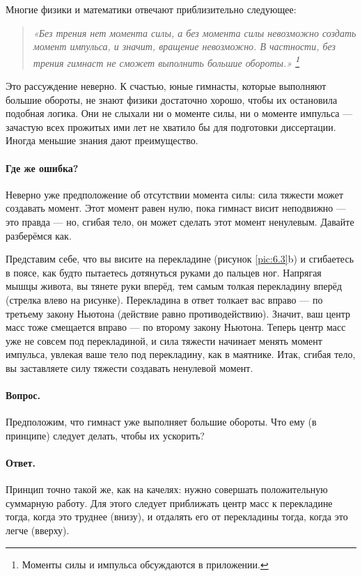 Многие физики и математики отвечают приблизительно следующее:
\begin{quote}
\emph{«Без трения нет момента силы, а без момента силы невозможно создать момент импульса,
и значит, вращение невозможно.
В частности, без трения гимнаст не сможет выполнить большие обороты.»
\footnote{Моменты силы и импульса обсуждаются в приложении.}}
\end{quote}

Это рассуждение неверно.
К счастью, юные гимнасты, которые выполняют большие обороты, не знают физики достаточно хорошо, чтобы их остановила подобная логика.
Они не слыхали ни о моменте силы, ни о моменте импульса ---
зачастую всех прожитых ими лет не хватило бы для подготовки диссертации.
Иногда меньшие знания дают преимущество.

\paragraph{Где же ошибка?}
Неверно уже предположение об отсутствии момента силы: сила тяжести может создавать момент.
Этот момент равен нулю, пока гимнаст висит неподвижно --- это правда --- но, сгибая тело, он может сделать этот момент ненулевым.
Давайте разберёмся как.

Представим себе, что вы висите на перекладине (рисунок \ref{pic:6.3}b) и сгибаетесь в поясе, как будто пытаетесь дотянуться руками до пальцев ног.
Напрягая мышцы живота, вы тянете руки вперёд, тем самым толкая перекладину вперёд (стрелка влево на рисунке).
Перекладина в ответ толкает вас вправо — по третьему закону Ньютона (действие равно противодействию).
Значит, ваш центр масс тоже смещается вправо — по второму закону Ньютона.
Теперь центр масс уже не совсем под перекладиной, и сила тяжести начинает менять момент импульса, увлекая ваше тело под перекладину, как в маятнике.
Итак, сгибая тело, вы заставляете силу тяжести создавать ненулевой момент.

\paragraph{Вопрос.}
Предположим, что гимнаст уже выполняет большие обороты.
Что ему (в принципе) следует делать, чтобы их ускорить?

\paragraph{Ответ.}
Принцип точно такой же, как на качелях: нужно совершать положительную суммарную работу.
Для этого следует приближать центр масс к перекладине тогда, когда это труднее (внизу), и отдалять его от перекладины тогда, когда это легче (вверху).

